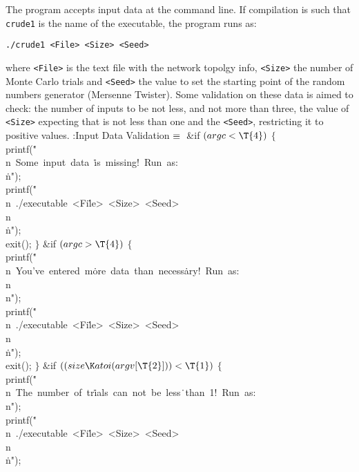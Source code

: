 The program accepts input data at the command line. If compilation is such that
{\tt crude1} is the name of the executable, the program runs as:
\smallskip
\centerline{\tt ./crude1 <File> <Size> <Seed>}
\smallskip
where {\tt<File>} is the text file with the network topolgy info, {\tt<Size>}
the number of Monte Carlo trials and {\tt<Seed>} the value to set the starting
point of the random numbers generator (Mersenne Twister). Some validation on
these data is aimed to check: the number of inputs to be not less, and not more
than three, the value of {\tt<Size>} expecting that is not less than one and
the
{\tt<Seed>}, restricting it to positive values.
\Y\B\4:Input Data Validation\X${}\equiv{}$\6
\&{if} ${}(\\{argc}<\T{4}){}$\5
${}\{{}$\1\6
\\{printf}(\.{"\\n\ Some\ input\ data\ }\)\.{is\ missing!\ Run\ as:\\}\)%
\.{n"});\6
\\{printf}(\.{"\\n\ ./executable\ <Fi}\)\.{le>\ <Size>\ <Seed>\\n\\}\)\.{n"});\6
\\{exit}();\6
\4${}\}{}$\2\6
\&{if} ${}(\\{argc}>\T{4}){}$\5
${}\{{}$\1\6
\\{printf}(\.{"\\n\ You've\ entered\ m}\)\.{ore\ data\ than\ necess}\)\.{ary!\
Run\ as:\\n\\n"});\6
\\{printf}(\.{"\\n\ ./executable\ <Fi}\)\.{le>\ <Size>\ <Seed>\\n\\}\)\.{n"});\6
\\{exit}(\T{1});\6
\4${}\}{}$\2\6
\&{if} ${}((\\{size}\K\\{atoi}(\\{argv}[\T{2}]))<\T{1}){}$\5
${}\{{}$\1\6
\\{printf}(\.{"\\n\ The\ number\ of\ tr}\)\.{ials\ can\ not\ be\ less}\)\.{\
than\ 1!\ Run\ as:\\n"});\6
\\{printf}(\.{"\\n\ ./executable\ <Fi}\)\.{le>\ <Size>\ <Seed>\\n\\}\)\.{n"});\6

